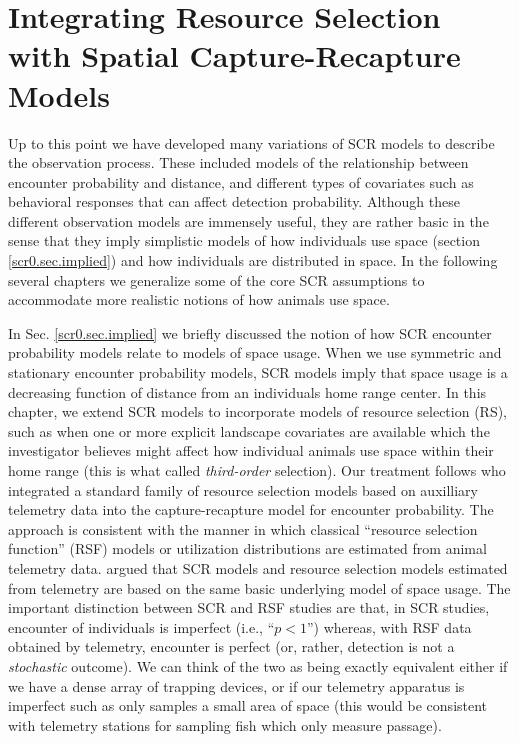 \chapter{
Integrating Resource Selection with
Spatial Capture-Recapture
  Models}

\label{chapt.rsf}


\vspace{.3in}

Up to this point we have developed many variations of SCR models to
describe the observation process.  These included models of the
relationship between encounter probability and distance, and different
types of covariates such as behavioral responses that can affect
detection probability.  Although these different observation models
are immensely useful, they are rather basic in the sense that they
imply simplistic models of how individuals use space (section
\ref{scr0.sec.implied}) and how individuals are distributed in space.
In the following several chapters we generalize some of the core SCR
assumptions to accommodate more realistic notions of how animals use
space.  


In Sec. \ref{scr0.sec.implied}
we briefly discussed the notion of how SCR encounter probability
models relate to models of space usage.
When we use symmetric and
stationary encounter probability models, SCR models 
imply that space usage is a decreasing function of distance from an
individuals home range center.  In this chapter,
we extend SCR models to incorporate models of resource selection (RS),
such as when one or more explicit landscape covariates are available
which the investigator believes might affect how individual animals
use space within their home range (this is what \citep{johnson:1980}
called {\it third-order} selection).  Our treatment follows
\citet{royle_etal:2012mee} who integrated a standard family of
resource selection models based on auxilliary telemetry data into the
capture-recapture model for encounter probability.  The approach is
consistent with the manner in which classical ``resource selection
function'' (RSF) models \citep{manly_etal:2002} or utilization
distributions \citep{worton:1989, fieberg:2005, fieberg:2007} are
estimated from animal telemetry data.  \citet{royle_etal:2012mee}
argued that SCR models and resource selection models estimated from
telemetry are based on the same basic underlying model of space
usage. The important distinction between SCR and RSF studies are that,
in SCR studies, encounter of individuals is imperfect (i.e.,
``$p<1$'') whereas, with RSF data obtained by telemetry, encounter is
perfect (or, rather, detection is not a {\it stochastic} outcome). We
can think of the two as being exactly equivalent either if we have a
dense array of trapping devices, or if our telemetry apparatus is
imperfect such as only samples a small area of space (this would be
consistent with telemetry stations for sampling fish which only
measure passage).



